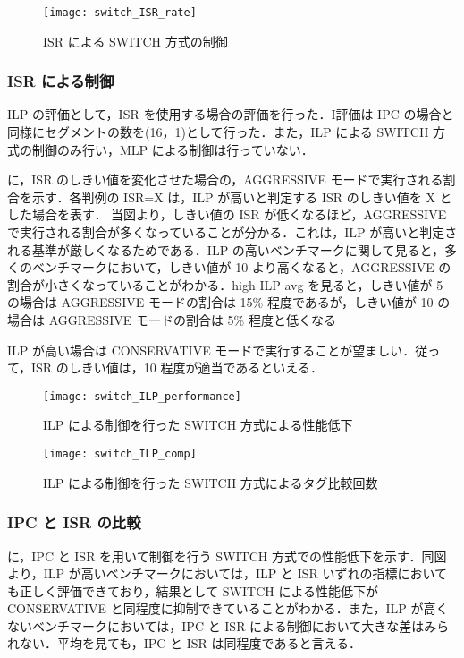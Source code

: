 \begin{figure}[htb]
  \centering
  \texttt{[image: switch\_ISR\_rate]}
  \caption{ISR による SWITCH 方式の制御}
  \label{fig:switch_ISR_rate}
\end{figure}

\subsubsection{ISR による制御}
ILP の評価として，ISR を使用する場合の評価を行った．I評価は IPC の場合と同様にセグメントの数を(16，1)として行った．また，ILP による SWITCH 方式の制御のみ行い，MLP による制御は行っていない．

に，ISR のしきい値を変化させた場合の，AGGRESSIVE モードで実行される割合を示す．各判例の ISR=X は，ILP が高いと判定する ISR のしきい値を X とした場合を表す．
当図より，しきい値の ISR が低くなるほど，AGGRESSIVE で実行される割合が多くなっていることが分かる．これは，ILP が高いと判定される基準が厳しくなるためである．ILP の高いベンチマークに関して見ると，多くのベンチマークにおいて，しきい値が 10 より高くなると，AGGRESSIVE の割合が小さくなっていることがわかる．high ILP avg を見ると，しきい値が 5 の場合は AGGRESSIVE モードの割合は 15\% 程度であるが，しきい値が 10 の場合は AGGRESSIVE モードの割合は 5\% 程度と低くなる

ILP が高い場合は CONSERVATIVE モードで実行することが望ましい．従って，ISR のしきい値は，10 程度が適当であるといえる．
\begin{figure}[htb]
  \centering
  \texttt{[image: switch\_ILP\_performance]}
  \caption{ILP による制御を行った SWITCH 方式による性能低下}
  \label{fig:switch_ILP_performance}
\end{figure}

\begin{figure}[htb]
  \centering
  \texttt{[image: switch\_ILP\_comp]}
  \caption{ILP による制御を行った SWITCH 方式によるタグ比較回数}
  \label{fig:switch_ILP_comp}
\end{figure}

\subsubsection{IPC と ISR の比較}
に，IPC と ISR を用いて制御を行う SWITCH 方式での性能低下を示す．同図より，ILP が高いベンチマークにおいては，ILP と ISR いずれの指標においても正しく評価できており，結果として SWITCH による性能低下が CONSERVATIVE と同程度に抑制できていることがわかる．また，ILP が高くないベンチマークにおいては，IPC と ISR による制御において大きな差はみられない．平均を見ても，IPC と ISR は同程度であると言える．

